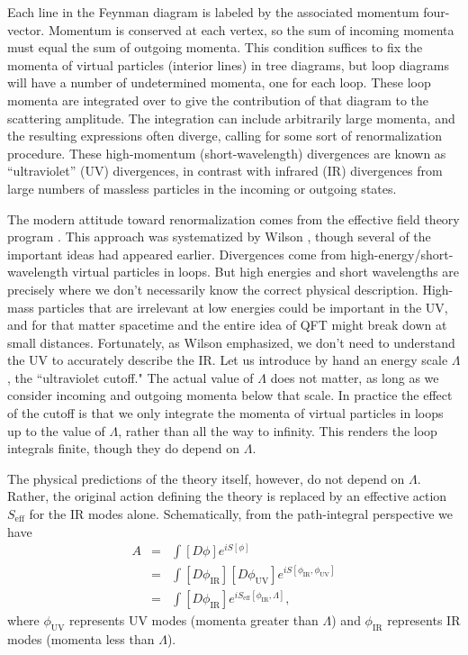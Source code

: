 \documentclass[12pt,letterpaper]{article}
\newcommand{\bea}{\begin{eqnarray}}
\newcommand{\eea}{\end{eqnarray}}
\newcommand{\uv}{{\mathrm{UV}}}
\newcommand{\ir}{{\mathrm{IR}}}
\newcommand{\eff}{{\mathrm{eff}}}
\begin{document}
Each line in the Feynman diagram is labeled by the associated momentum four-vector.
Momentum is conserved at each vertex, so the sum of incoming momenta must equal the sum of outgoing momenta.
This condition suffices to fix the momenta of virtual particles (interior lines) in tree diagrams, but loop diagrams will have a number of undetermined momenta, one for each loop.
These loop momenta are integrated over to give the contribution of that diagram to the scattering amplitude.
The integration can include arbitrarily large momenta, and the resulting expressions often diverge, calling for some sort of renormalization procedure.
These high-momentum (short-wavelength) divergences are known as ``ultraviolet'' (UV) divergences, in contrast with infrared (IR) divergences from large numbers of massless particles in the incoming or outgoing states.

The modern attitude toward renormalization comes from the effective field theory program \citep{Manohar:2018aog,rivat2020philosophical}. 
This approach was systematized by Wilson \citep{Wilson:1971bg,Wilson:1971dh,Wilson:1973jj,Polchinski:1983gv}, though several of the important ideas had appeared earlier.
Divergences come from high-energy/short-wavelength virtual particles in loops.
But high energies and short wavelengths are precisely where we don't necessarily know the correct physical description.
High-mass particles that are irrelevant at low energies could be important in the UV, and for that matter spacetime and the entire idea of QFT might break down at small distances.
Fortunately, as Wilson emphasized, we don't need to understand the UV to accurately describe the IR. 
Let us introduce by hand an energy scale $\Lambda$, the ``ultraviolet cutoff."
The actual value of $\Lambda$ does not matter, as long as we consider incoming and outgoing momenta below that scale.
In practice the effect of the cutoff is that we only integrate the momenta of virtual particles in loops up to the value of $\Lambda$, rather than all the way to infinity.
This renders the loop integrals finite, though they do depend on $\Lambda$.

The physical predictions of the theory itself, however, do not depend on $\Lambda$.
Rather, the original action defining the theory is replaced by an effective action $S_{\eff}$ for the IR modes alone.
Schematically, from the path-integral perspective we have
\bea
A &=& \int [D\phi] e^{iS[\phi]}\\
&=& \int[D\phi_\ir][D\phi_\uv] e^{iS[\phi_\ir, \phi_\uv]}\\
&=& \int [D\phi_\ir]e^{iS_{\eff}[\phi_\ir, \Lambda]}, \label{effectivepathintegral}
\eea
where $\phi_\uv$ represents UV modes (momenta greater than $\Lambda$) and $\phi_\ir$ represents IR modes (momenta less than $\Lambda$).
\end{document}
